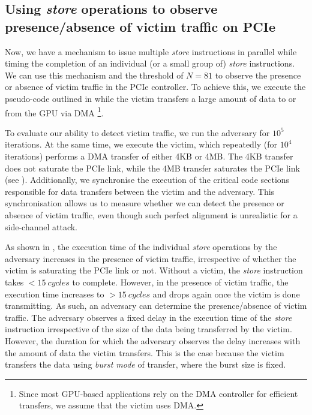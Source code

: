 \subsection{Using \textit{store} operations to observe presence/absence of victim traffic on PCIe}
\label{subsec:interconnect-sc-store-ops-measuring-time}
Now, we have a mechanism to issue multiple \textit{store} instructions in parallel while timing the completion of an individual (or a small group of) \textit{store} instructions.
We can use this mechanism and the threshold of $N = 81$ to observe the presence or absence of victim traffic in the PCIe controller.
To achieve this, we execute the pseudo-code outlined in  while the victim transfers a large amount of data to or from the GPU via DMA
\footnote{Since most GPU-based applications rely on the DMA controller for efficient transfers, we assume that the victim uses DMA.}.

To evaluate our ability to detect victim traffic, we run the adversary for $10^5$ iterations.
At the same time, we execute the victim, which repeatedly (for $10^4$ iterations) performs a DMA transfer of either 4KB or 4MB.
The 4KB transfer does not saturate the PCIe link, while the 4MB transfer saturates the PCIe link (see ).
Additionally, we synchronise the execution of the critical code sections responsible for data transfers between the victim and the adversary. 
This synchronisation allows us to measure whether we can detect the presence or absence of victim traffic, even though such perfect alignment is unrealistic for a side-channel attack.

As shown in , the execution time of the individual \textit{store} operations by the adversary increases in the presence of victim traffic, irrespective of whether the victim is saturating the PCIe link or not.
Without a victim, the \textit{store} instruction takes $<15~cycles$ to complete. However, in the presence of victim traffic, the execution time increases to $>15~cycles$ and drops again once the victim is done transmitting.
As such, an adversary can determine the presence/absence of victim traffic.
The adversary observes a fixed delay in the execution time of the \textit{store} instruction irrespective of the size of the data being transferred by the victim.
However, the duration for which the adversary observes the delay increases with the amount of data the victim transfers.
This is the case because the victim transfers the data using \textit{burst mode} of transfer, where the burst size is fixed.


